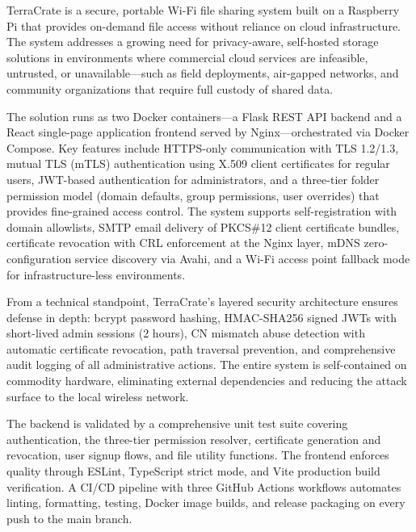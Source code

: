 \documentclass[12pt,letterpaper]{report}
\begin{document}
TerraCrate is a secure, portable Wi-Fi file sharing system built on a Raspberry Pi that provides on-demand file access without reliance on cloud infrastructure. The system addresses a growing need for privacy-aware, self-hosted storage solutions in environments where commercial cloud services are infeasible, untrusted, or unavailable---such as field deployments, air-gapped networks, and community organizations that require full custody of shared data.

The solution runs as two Docker containers---a Flask REST API backend and a React single-page application frontend served by Nginx---orchestrated via Docker Compose. Key features include HTTPS-only communication with TLS 1.2/1.3, mutual TLS (mTLS) authentication using X.509 client certificates for regular users, JWT-based authentication for administrators, and a three-tier folder permission model (domain defaults, group permissions, user overrides) that provides fine-grained access control. The system supports self-registration with domain allowlists, SMTP email delivery of PKCS\#12 client certificate bundles, certificate revocation with CRL enforcement at the Nginx layer, mDNS zero-configuration service discovery via Avahi, and a Wi-Fi access point fallback mode for infrastructure-less environments.

From a technical standpoint, TerraCrate's layered security architecture ensures defense in depth: bcrypt password hashing, HMAC-SHA256 signed JWTs with short-lived admin sessions (2 hours), CN mismatch abuse detection with automatic certificate revocation, path traversal prevention, and comprehensive audit logging of all administrative actions. The entire system is self-contained on commodity hardware, eliminating external dependencies and reducing the attack surface to the local wireless network.

The backend is validated by a comprehensive unit test suite covering authentication, the three-tier permission resolver, certificate generation and revocation, user signup flows, and file utility functions. The frontend enforces quality through ESLint, TypeScript strict mode, and Vite production build verification. A CI/CD pipeline with three GitHub Actions workflows automates linting, formatting, testing, Docker image builds, and release packaging on every push to the main branch.
\listoftables
{}
\newpage
\end{document}
